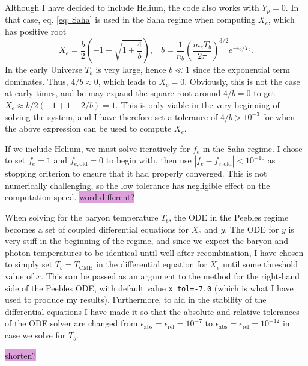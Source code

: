 \documentclass{aa}
\numberwithin{equation}{section}
\numberwithin{table}{section}
\numberwithin{figure}{section}
\begin{document}
Although I have decided to include Helium, the code also works with $Y_p=0$. In that case, eq. \eqref{eq: Saha} is used in the Saha regime when computing $X_e$, which has positive root
\begin{equation}
  X_e = \frac{b}{2}\left(-1+\sqrt{1 + \frac{4}{b}}\right), \hspace{10pt} b = \frac{1}{n_b}\left( \frac{m_eT_b}{2\pi}\right)^{3/2}e^{-\epsilon_0/T_b}.
\end{equation}
In the early Universe $T_b$ is very large, hence $b\ll 1$ since the exponential term dominates. Thus, $4/b\approx0$, which leads to $X_e = 0$. Obviously, this is not the case at early times, and be may expand the square root around $4/b = 0$ to get $X_e \approx b/2(-1 + 1 + 2/b)=1$. This is only viable in the very beginning of solving the system, and I have therefore set a tolerance of $4/b>10^{-3}$ for when the above expression can be used to compute $X_e$.

If we include Helium, we must solve iteratively for $f_e$ in the Saha regime. I chose to set $f_e = 1$ and $f_{e,\text{old}}=0$ to begin with, then use $\left|f_e-f_{e,\text{old}}\right|<10^{-10}$ as stopping criterion to ensure that it had properly converged. This is not numerically challenging, so the low tolerance has negligible effect on the computation speed. \colorbox{Plum}{word different?}

When solving for the baryon temperature $T_b$, the ODE in the Peebles regime becomes a set of coupled differential equations for $X_e$ and $y$. The ODE for $y$ is very stiff in the beginning of the regime, and since we expect the baryon and photon temperatures to be identical until well after recombination, I have chosen to simply set $T_b=T_\text{CMB}$ in the differential equation for $X_e$ until some threshold value of $x$. This can be passed as an argument to the method for the right-hand side of the Peebles ODE, with default value \verb|x_tol=-7.0| (which is what I have used to produce my results). Furthermore, to aid in the stability of the differential equations I have made it so that the absolute and relative tolerances of the ODE solver are changed from $\epsilon_\text{abs}=\epsilon_\text{rel}=10^{-7}$ to $\epsilon_\text{abs}=\epsilon_\text{rel}=10^{-12}$ in case we solve for $T_b$. 

\colorbox{Plum}{shorten?}
\end{document}
